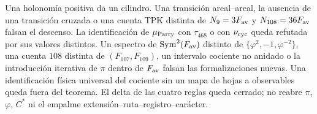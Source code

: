 Una holonomía positiva da un cilindro. Una transición areal--areal, la
ausencia de una transición cruzada o una cuenta TPK distinta de
\(N_9=3F_{\rm av}\) y \(N_{108}=36F_{\rm av}\) falsan el descenso. La
identificación de \(\mu_{\rm Parry}\) con \(\tau_{468}\) o con
\(\nu_{\rm cyc}\) queda refutada por sus valores distintos. Un espectro de
\(\operatorname{Sym}^2(F_{\rm av})\) distinto de
\(\{\varphi^2,-1,\varphi^{-2}\}\), una cuenta \(108\) distinta de
\((F_{107},F_{109})\), un intervalo cociente no anidado o la introducción
iterativa de \(\pi\) dentro de \(F_{\rm av}\) falsan las formalizaciones
nuevas. Una identificación física universal del cociente sin un mapa de
hojas a observables queda fuera del teorema. El delta de las cuatro reglas
queda cerrado; no reabre \(\pi\), \(\varphi\), \(C^*\) ni el empalme
extensión--ruta--registro--carácter.
